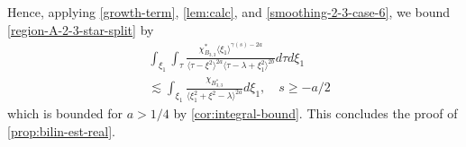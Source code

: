 \documentclass[12pt,reqno]{amsart}
\numberwithin{equation}{section}  %
\begin{document}
Hence, applying
\eqref{growth-term}, \cref{lem:calc}, and
\eqref{smoothing-2-3-case-6}, we bound \eqref{region-A-2-3-star-split} by
%
%
\begin{equation*}
\begin{split}
   & \int_{\xi_{1}} \int_{\tau} \frac{\chi^{*}_{B_{3,3}} \langle
   \xi_{1} \rangle ^{\gamma(s) -2a}
    }{ \langle  \tau  - \xi^{2}
    \rangle ^{2a}   \langle  \tau - \lambda+\xi_{1}^{2}
    \rangle^{2b} } d \tau d \xi_{1}
\\
& \lesssim  \int_{\xi_{1}} \frac{\chi_{B_{3,3}^{*}}}{\langle \xi_{1}^{2} +
\xi^{2} - \lambda \rangle^{2 a} } d \xi_{1}, \quad s \ge -a/2
\end{split}
\end{equation*}
which is bounded for $a > 1/4$ by \cref{cor:integral-bound}. This concludes the proof of \cref{prop:bilin-est-real}. \qquad \qedsymbol
%
%
\newpage
\end{document}
